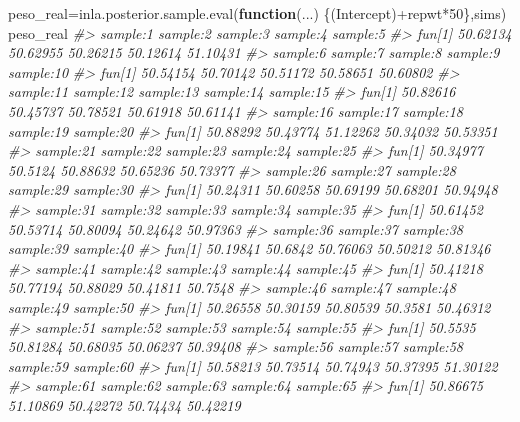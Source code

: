 \documentclass[
]{book}
\newenvironment{Shaded}{\begin{snugshade}}{\end{snugshade}}
\newcommand{\CommentTok}[1]{\textcolor[rgb]{0.56,0.35,0.01}{\textit{#1}}}
\newcommand{\ControlFlowTok}[1]{\textcolor[rgb]{0.13,0.29,0.53}{\textbf{#1}}}
\newcommand{\DecValTok}[1]{\textcolor[rgb]{0.00,0.00,0.81}{#1}}
\newcommand{\FunctionTok}[1]{\textcolor[rgb]{0.00,0.00,0.00}{#1}}
\newcommand{\NormalTok}[1]{#1}
\newcommand{\OtherTok}[1]{\textcolor[rgb]{0.56,0.35,0.01}{#1}}
\newcommand{\SpecialCharTok}[1]{\textcolor[rgb]{0.00,0.00,0.00}{#1}}
\begin{document}
\begin{Shaded}
\begin{Highlighting}[]
\NormalTok{peso\_real}\OtherTok{=}\FunctionTok{inla.posterior.sample.eval}\NormalTok{(}\ControlFlowTok{function}\NormalTok{(...) \{(Intercept)}\SpecialCharTok{+}\NormalTok{repwt}\SpecialCharTok{*}\DecValTok{50}\NormalTok{\},sims)}
\NormalTok{peso\_real}
\CommentTok{\#\textgreater{}        sample:1 sample:2 sample:3 sample:4 sample:5}
\CommentTok{\#\textgreater{} fun[1] 50.62134 50.62955 50.26215 50.12614 51.10431}
\CommentTok{\#\textgreater{}        sample:6 sample:7 sample:8 sample:9 sample:10}
\CommentTok{\#\textgreater{} fun[1] 50.54154 50.70142 50.51172 50.58651  50.60802}
\CommentTok{\#\textgreater{}        sample:11 sample:12 sample:13 sample:14 sample:15}
\CommentTok{\#\textgreater{} fun[1]  50.82616  50.45737  50.78521  50.61918  50.61141}
\CommentTok{\#\textgreater{}        sample:16 sample:17 sample:18 sample:19 sample:20}
\CommentTok{\#\textgreater{} fun[1]  50.88292  50.43774  51.12262  50.34032  50.53351}
\CommentTok{\#\textgreater{}        sample:21 sample:22 sample:23 sample:24 sample:25}
\CommentTok{\#\textgreater{} fun[1]  50.34977   50.5124  50.88632  50.65236  50.73377}
\CommentTok{\#\textgreater{}        sample:26 sample:27 sample:28 sample:29 sample:30}
\CommentTok{\#\textgreater{} fun[1]  50.24311  50.60258  50.69199  50.68201  50.94948}
\CommentTok{\#\textgreater{}        sample:31 sample:32 sample:33 sample:34 sample:35}
\CommentTok{\#\textgreater{} fun[1]  50.61452  50.53714  50.80094  50.24642  50.97363}
\CommentTok{\#\textgreater{}        sample:36 sample:37 sample:38 sample:39 sample:40}
\CommentTok{\#\textgreater{} fun[1]  50.19841   50.6842  50.76063  50.50212  50.81346}
\CommentTok{\#\textgreater{}        sample:41 sample:42 sample:43 sample:44 sample:45}
\CommentTok{\#\textgreater{} fun[1]  50.41218  50.77194  50.88029  50.41811   50.7548}
\CommentTok{\#\textgreater{}        sample:46 sample:47 sample:48 sample:49 sample:50}
\CommentTok{\#\textgreater{} fun[1]  50.26558  50.30159  50.80539   50.3581  50.46312}
\CommentTok{\#\textgreater{}        sample:51 sample:52 sample:53 sample:54 sample:55}
\CommentTok{\#\textgreater{} fun[1]   50.5535  50.81284  50.68035  50.06237  50.39408}
\CommentTok{\#\textgreater{}        sample:56 sample:57 sample:58 sample:59 sample:60}
\CommentTok{\#\textgreater{} fun[1]  50.58213  50.73514  50.74943  50.37395  51.30122}
\CommentTok{\#\textgreater{}        sample:61 sample:62 sample:63 sample:64 sample:65}
\CommentTok{\#\textgreater{} fun[1]  50.86675  51.10869  50.42272  50.74434  50.42219}

\end{Highlighting}
\end{Shaded}
\end{document}

